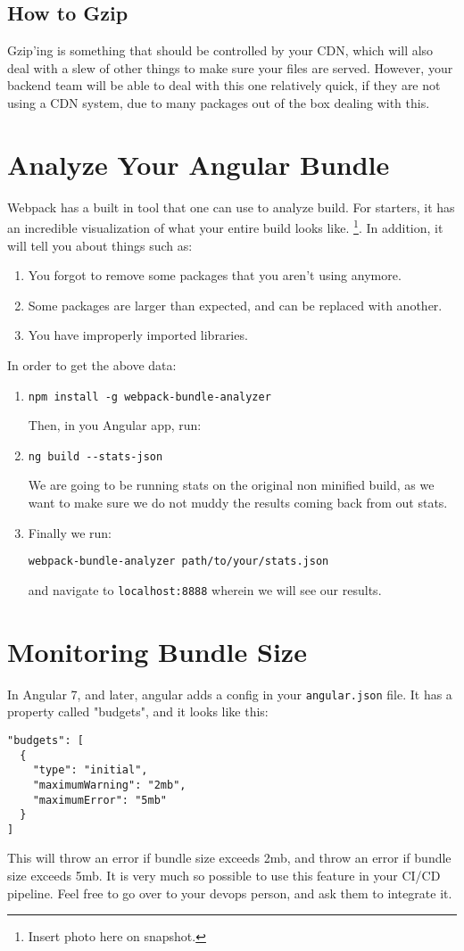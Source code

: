 \subsection{ How to Gzip }
Gzip'ing is something that should be controlled by your CDN, which will also 
deal with a slew of other things to make sure your files are served. However, 
your backend team will be able to deal with this one relatively quick, if they 
are not using a CDN system, due to many packages out of the box dealing with 
this. 

\section{Analyze Your Angular Bundle}
Webpack has a built in tool that one can use to analyze build. For starters, 
it has an incredible visualization of what your entire build looks like.
\footnote{Insert photo here on snapshot.}. In addition, it will tell you about 
things such as: 
\begin{enumerate}
  \item You forgot to remove some packages that you aren't using anymore.
  \item Some packages are larger than expected, and can be replaced with
  another.
  \item You have improperly imported libraries.
\end{enumerate}

In order to get the above data: 
\begin{enumerate}
\item 
\begin{verbatim}
npm install -g webpack-bundle-analyzer 
\end{verbatim}
Then, in you Angular app, run: 
\item 
\begin{verbatim}
ng build --stats-json
\end{verbatim}
We are going to be running stats on the original non minified build, as we 
want to make sure we do not muddy the results coming back from out stats. 
\item 
Finally we run: 
\begin{verbatim}
webpack-bundle-analyzer path/to/your/stats.json  
\end{verbatim}
and navigate to \lstinline{localhost:8888} wherein we will see our results.
\end{enumerate}

\section{Monitoring Bundle Size}
In Angular 7, and later, angular adds a config in your \lstinline{angular.json}
file. It has a property called "budgets", and it looks like this: 
\begin{lstlisting}
"budgets": [
  {
    "type": "initial",
    "maximumWarning": "2mb",
    "maximumError": "5mb"
  }
]   
\end{lstlisting}

This will throw an error if bundle size exceeds 2mb, and throw an error if 
bundle size exceeds 5mb. It is very much so possible to use this feature in
your CI/CD pipeline. Feel free to go over to your devops person, and ask them 
to integrate it. 
